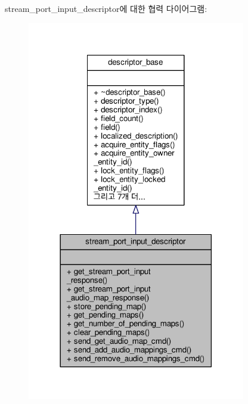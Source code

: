 stream\+\_\+port\+\_\+input\+\_\+descriptor에 대한 협력 다이어그램\+:
\nopagebreak
\begin{figure}[H]
\begin{center}
\leavevmode
\includegraphics[width=270pt]{classavdecc__lib_1_1stream__port__input__descriptor__coll__graph}
\end{center}
\end{figure}
